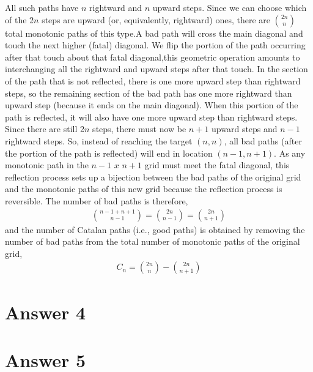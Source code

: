 \documentclass[12pt]{article}
\begin{document}
All such paths have $n$ rightward and $n$ upward steps. Since we can choose which of the 2$n$ steps are upward (or, equivalently, rightward) ones, there are $\binom {2n}{n}$ total monotonic paths of this type.A bad path will cross the main diagonal and touch the next higher (fatal) diagonal. We flip the portion of the path occurring after that touch about that fatal diagonal,this geometric operation amounts to interchanging all the rightward and upward steps after that touch. In the section of the path that is not reflected, there is one more upward step than rightward steps, so the remaining section of the bad path has one more rightward than upward step (because it ends on the main diagonal). When this portion of the path is reflected, it will also have one more upward step than rightward steps. Since there are still 2$n$ steps, there must now be $n+1$ upward steps and $n-1$ rightward steps. So, instead of reaching the target $(n,n)$, all bad paths (after the portion of the path is reflected) will end in location $(n-1,n+1)$. As any monotonic path in the $n-1$ $x$ $n+1$ grid must meet the fatal diagonal, this reflection process sets up a bijection between the bad paths of the original grid and the monotonic paths of this new grid because the reflection process is reversible. The number of bad paths is therefore,
\begin{align*}
\binom{n-1+n+1}{n-1} = \binom{2n}{n-1}= \binom{2n}{n+1}
\end{align*}
and the number of Catalan paths (i.e., good paths) is obtained by removing the number of bad paths from the total number of monotonic paths of the original grid,
\begin{align*}
C_n = \binom{2n}{n} - \binom{2n}{n+1}
\end{align*}
\section*{Answer 4}


\section*{Answer 5}
\end{document}
